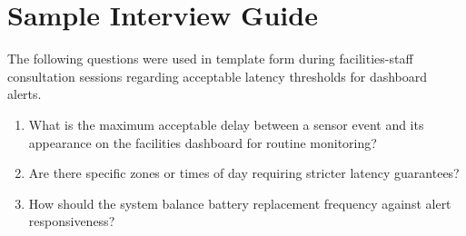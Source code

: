 \chapter{Sample Interview Guide}
\label{app:interview}

The following questions were used in template form during facilities-staff consultation sessions
regarding acceptable latency thresholds for dashboard alerts.

\begin{enumerate}[label=Q\arabic*.]
  \item What is the maximum acceptable delay between a sensor event and its appearance on the
        facilities dashboard for routine monitoring?
  \item Are there specific zones or times of day requiring stricter latency guarantees?
  \item How should the system balance battery replacement frequency against alert responsiveness?
\end{enumerate}
